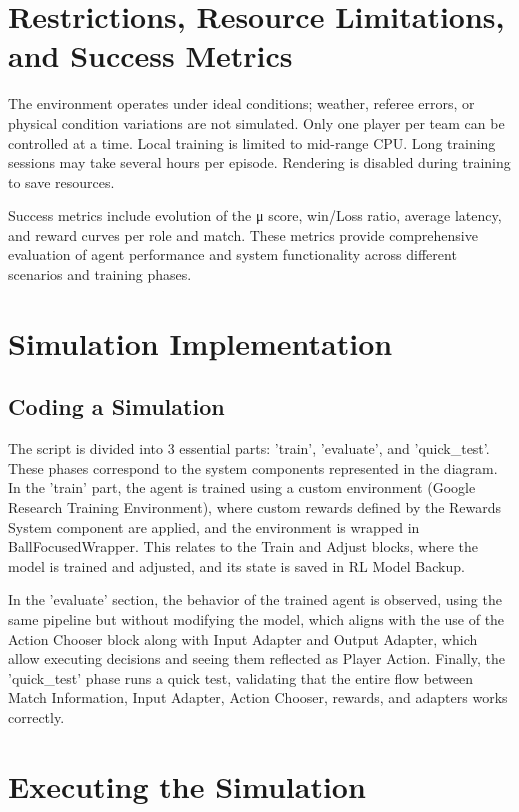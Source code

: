 \documentclass[12pt,a4paper]{article}
\begin{document}
\section{Restrictions, Resource Limitations, and Success Metrics}

The environment operates under ideal conditions; weather, referee errors, or physical condition variations are not simulated. Only one player per team can be controlled at a time. Local training is limited to mid-range CPU. Long training sessions may take several hours per episode. Rendering is disabled during training to save resources.

Success metrics include evolution of the μ score, win/Loss ratio, average latency, and reward curves per role and match. These metrics provide comprehensive evaluation of agent performance and system functionality across different scenarios and training phases.

\section{Simulation Implementation}

\subsection{Coding a Simulation}

The script is divided into 3 essential parts: 'train', 'evaluate', and 'quick\_test'. These phases correspond to the system components represented in the diagram. In the 'train' part, the agent is trained using a custom environment (Google Research Training Environment), where custom rewards defined by the Rewards System component are applied, and the environment is wrapped in BallFocusedWrapper. This relates to the Train and Adjust blocks, where the model is trained and adjusted, and its state is saved in RL Model Backup.

In the 'evaluate' section, the behavior of the trained agent is observed, using the same pipeline but without modifying the model, which aligns with the use of the Action Chooser block along with Input Adapter and Output Adapter, which allow executing decisions and seeing them reflected as Player Action. Finally, the 'quick\_test' phase runs a quick test, validating that the entire flow between Match Information, Input Adapter, Action Chooser, rewards, and adapters works correctly.

\section{Executing the Simulation}
\end{document}
